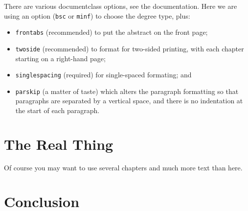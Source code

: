 \documentclass[bsc,frontabs,twoside,singlespacing,parskip,deptreport]{infthesis}
\begin{document}
There are various documentclass options, see the documentation.  Here we are
using an option ({\tt bsc} or {\tt minf}) to choose the degree type, plus:
\begin{itemize}
\item {\tt frontabs} (recommended) to put the abstract on the front page;
\item {\tt twoside} (recommended) to format for two-sided printing, with
  each chapter starting on a right-hand page;
\item {\tt singlespacing} (required) for single-spaced formating; and
\item {\tt parskip} (a matter of taste) which alters the paragraph formatting so that
paragraphs are separated by a vertical space, and there is no
indentation at the start of each paragraph.
\end{itemize}

\chapter{The Real Thing}

Of course
you may want to use several chapters and much more text than here.




\chapter{Conclusion}



\end{document}
